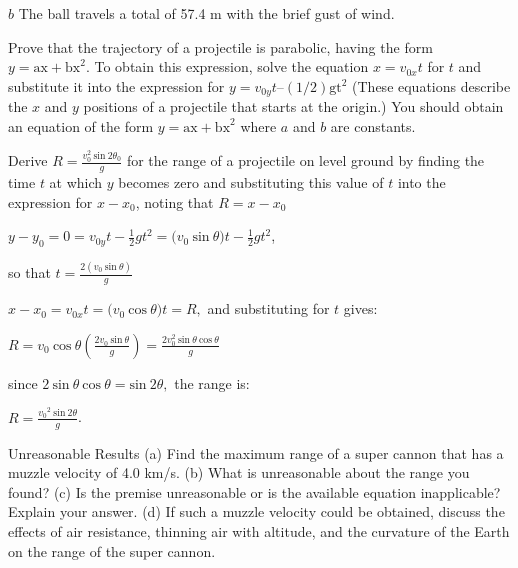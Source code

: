 \documentclass[
]{book}
\newenvironment{problems-exercises}{}{}
\newenvironment{tinysection}{}{}
\begin{document}
\begin{problems-exercises}
\(b\) The ball travels a total of 57.4 m with the brief gust of wind.

\hypertarget{fs-id2046931}{}
\leavevmode\hypertarget{fs-id2241558}{}%
Prove that the trajectory of a projectile is parabolic, having the form
\({y = {\text{ax} + \text{bx}^{2}}}{}\). To obtain this expression, solve
the equation \({x = v_{0x}t}{}\) for \(t{}\) and substitute it into the
expression for \({{y = v_{0y}}t–({1/2})\text{gt}^{2}}{}\) (These equations
describe the \(x{}\) and \(y{}\) positions of a projectile that starts at
the origin.) You should obtain an equation of the form
\({y = {\text{ax} + \text{bx}^{2}}}{}\) where \(a{}\) and \(b{}\) are
constants.

\hypertarget{fs-id2133758}{}
\leavevmode\hypertarget{fs-id2890360}{}%
Derive \({R = \frac{v_{0}^{2}\ \text{sin}\ 2\theta_{0}}{g}}{}\) for the
range of a projectile on level ground by finding the time \(t{}\) at which
\(y{}\) becomes zero and substituting this value of \(t{}\) into the
expression for \({x - x_{0}}{}\), noting that \({R = {x - x_{0}}}{}\)

\leavevmode\hypertarget{eip-id2932521}{}%
\({{{{y - y_{0}} = 0} = v_{0y}}{t - \frac{1}{2}}{{gt}^{2} = (}v_{0}\ \text{sin}\ \theta){t - \frac{1}{2}}{gt}^{2}}{}\),

so that \({t = \frac{2(v_{0}\ \text{sin}\ \theta)}{g}}{}\)

\({{{x - x_{0}} = v_{0x}}{t = (}v_{0}\ \text{cos}\ \theta){t = R},}{}\)
and substituting for \(t{}\) gives:

\({{R = v_{0}}\ \text{cos}\ \theta{\left( \frac{{2v}_{0}\ \text{sin}\ \theta}{g} \right) = \frac{{2v}_{0}^{2}\ \text{sin}\ \theta\ \text{cos}\ \theta}{g}}}{}\)

since
\({2\ \text{sin}\ \theta\ \text{cos}\ {\theta = \text{sin}\ }2\theta,}{}\)
the range is:

\({R = \frac{{v_{0}}^{2}\ \text{sin}\ 2\theta}{g}}{}\).

\hypertarget{fs-id1794949}{}
\hypertarget{fs-id1626931}{}
\begin{tinysection}

{Unreasonable Results} (a) Find the maximum range of
a super cannon that has a muzzle velocity of 4.0 km/s. (b) What is
unreasonable about the range you found? (c) Is the premise unreasonable
or is the available equation inapplicable? Explain your answer. (d) If
such a muzzle velocity could be obtained, discuss the effects of air
resistance, thinning air with altitude, and the curvature of the Earth
on the range of the super cannon.


\end{tinysection}
\end{problems-exercises}
\end{document}
